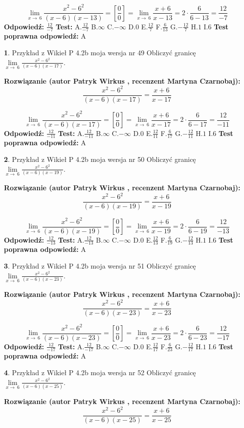\documentclass[12pt, a4paper]{article}
\theoremstyle{definition} %
\newtheorem{zad}{}
\newcommand{\zadStart}[1]{\begin{zad}#1\newline}
\newcommand{\zadStop}{\end{zad}}
\newcommand{\rozwStart}[2]{\noindent \textbf{Rozwiązanie (autor #1 , recenzent #2): }\newline}
\newcommand{\rozwStop}{\newline}
\newcommand{\odpStart}{\noindent \textbf{Odpowiedź:}\newline}
\newcommand{\odpStop}{\newline}
\newcommand{\testStart}{\noindent \textbf{Test:}\newline}
\newcommand{\testStop}{\newline}
\newcommand{\kluczStart}{\noindent \textbf{Test poprawna odpowiedź:}\newline}
\newcommand{\kluczStop}{\newline}
\begin{document}
$$\lim\limits_{x\to\ 6}\frac{x^{2}-6^{2}}{(x-6)(x-13)}=[\frac{0}{0}]=\lim\limits_{x\to\ 6}\frac{x+6}{x-13}=2 \cdot \frac{6}{6-13} = \frac{12}{-7}$$
\rozwStop
\odpStart
$\frac{12}{-7}$
\odpStop
\testStart
A.$\frac{12}{-7}$
B.$\infty$
C.$-\infty$
D.$0$
E.$\frac{12}{7}$
F.$\frac{6}{13}$
G.$-\frac{12}{7}$
H.$1$
I.$6$
\testStop
\kluczStart
A
\kluczStop



\zadStart{Przykład z Wikieł P 4.2b moja wersja nr 49}
Obliczyć granicę $\lim\limits_{x\to\ 6}\frac{x^{2}-6^{2}}{(x-6)(x-17)}$.
\zadStop
\rozwStart{Patryk Wirkus}{Martyna Czarnobaj}
$$\frac{x^{2}-6^{2}}{(x-6)(x-17)}=\frac{x+6}{x-17}$$

$$\lim\limits_{x\to\ 6}\frac{x^{2}-6^{2}}{(x-6)(x-17)}=[\frac{0}{0}]=\lim\limits_{x\to\ 6}\frac{x+6}{x-17}=2 \cdot \frac{6}{6-17} = \frac{12}{-11}$$
\rozwStop
\odpStart
$\frac{12}{-11}$
\odpStop
\testStart
A.$\frac{12}{-11}$
B.$\infty$
C.$-\infty$
D.$0$
E.$\frac{12}{11}$
F.$\frac{6}{17}$
G.$-\frac{12}{11}$
H.$1$
I.$6$
\testStop
\kluczStart
A
\kluczStop



\zadStart{Przykład z Wikieł P 4.2b moja wersja nr 50}
Obliczyć granicę $\lim\limits_{x\to\ 6}\frac{x^{2}-6^{2}}{(x-6)(x-19)}$.
\zadStop
\rozwStart{Patryk Wirkus}{Martyna Czarnobaj}
$$\frac{x^{2}-6^{2}}{(x-6)(x-19)}=\frac{x+6}{x-19}$$

$$\lim\limits_{x\to\ 6}\frac{x^{2}-6^{2}}{(x-6)(x-19)}=[\frac{0}{0}]=\lim\limits_{x\to\ 6}\frac{x+6}{x-19}=2 \cdot \frac{6}{6-19} = \frac{12}{-13}$$
\rozwStop
\odpStart
$\frac{12}{-13}$
\odpStop
\testStart
A.$\frac{12}{-13}$
B.$\infty$
C.$-\infty$
D.$0$
E.$\frac{12}{13}$
F.$\frac{6}{19}$
G.$-\frac{12}{13}$
H.$1$
I.$6$
\testStop
\kluczStart
A
\kluczStop



\zadStart{Przykład z Wikieł P 4.2b moja wersja nr 51}
Obliczyć granicę $\lim\limits_{x\to\ 6}\frac{x^{2}-6^{2}}{(x-6)(x-23)}$.
\zadStop
\rozwStart{Patryk Wirkus}{Martyna Czarnobaj}
$$\frac{x^{2}-6^{2}}{(x-6)(x-23)}=\frac{x+6}{x-23}$$

$$\lim\limits_{x\to\ 6}\frac{x^{2}-6^{2}}{(x-6)(x-23)}=[\frac{0}{0}]=\lim\limits_{x\to\ 6}\frac{x+6}{x-23}=2 \cdot \frac{6}{6-23} = \frac{12}{-17}$$
\rozwStop
\odpStart
$\frac{12}{-17}$
\odpStop
\testStart
A.$\frac{12}{-17}$
B.$\infty$
C.$-\infty$
D.$0$
E.$\frac{12}{17}$
F.$\frac{6}{23}$
G.$-\frac{12}{17}$
H.$1$
I.$6$
\testStop
\kluczStart
A
\kluczStop



\zadStart{Przykład z Wikieł P 4.2b moja wersja nr 52}
Obliczyć granicę $\lim\limits_{x\to\ 6}\frac{x^{2}-6^{2}}{(x-6)(x-25)}$.
\zadStop
\rozwStart{Patryk Wirkus}{Martyna Czarnobaj}
$$\frac{x^{2}-6^{2}}{(x-6)(x-25)}=\frac{x+6}{x-25}$$
\end{document}
